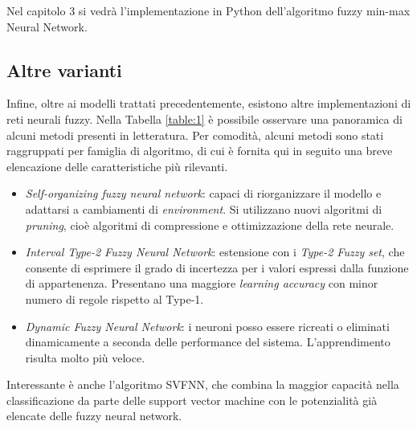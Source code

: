 \documentclass[11pt,  oneside, openany]{book}
\begin{document}
Nel capitolo 3 si vedrà l'implementazione in Python dell'algoritmo fuzzy min-max Neural Network.

\subsection{Altre varianti}

Infine, oltre ai modelli trattati precedentemente, esistono altre implementazioni di reti neurali fuzzy. Nella Tabella \ref{table:1} è possibile osservare una panoramica di alcuni metodi presenti in letteratura. Per comodità, alcuni metodi sono stati raggruppati per famiglia di algoritmo, di cui è fornita qui in seguito una breve elencazione delle caratteristiche più rilevanti. 

\begin{itemize}
\item \textit{Self-organizing fuzzy neural network}:  capaci di riorganizzare il modello e adattarsi a cambiamenti di \textit{environment}. Si utilizzano nuovi algoritmi di \textit{pruning}, cioè algoritmi di compressione e ottimizzazione della rete neurale. 
\item \textit{Interval Type-2 Fuzzy Neural Network}: estensione con i \textit{Type-2 Fuzzy set}, che consente di esprimere il grado di incertezza per i valori espressi dalla funzione di appartenenza. Presentano una maggiore \textit{learning accuracy} con minor numero di regole rispetto al Type-1.
\item \textit{Dynamic Fuzzy Neural Network}: i neuroni posso essere ricreati o eliminati dinamicamente a seconda delle performance del sistema. L'apprendimento risulta molto più veloce. 
\end{itemize}

Interessante è anche l'algoritmo SVFNN, che combina la maggior capacità nella classificazione da parte delle support vector machine con le potenzialità già elencate delle fuzzy neural network. 
\end{document}
